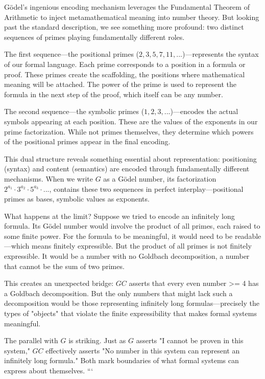 \documentclass[runningheads]{llncs}
\begin{document}
Gödel's ingenious encoding mechanism leverages the Fundamental Theorem of Arithmetic to inject metamathematical meaning into number theory. But looking past the standard description, we see something more profound: two distinct sequences of primes playing fundamentally different roles.

The first sequence—the positional primes ($2, 3, 5, 7, 11, ...$)—represents the syntax of our formal language. Each prime corresponds to a position in a formula or proof. These primes create the scaffolding, the positions where mathematical meaning will be attached. The power of the prime is used to represent the formula in the next step of the proof, which itself can be any number.

The second sequence—the symbolic primes ($1, 2, 3, ...$)—encodes the actual symbols appearing at each position. These are the values of the exponents in our prime factorization. While not primes themselves, they determine which powers of the positional primes appear in the final encoding.

This dual structure reveals something essential about representation: positioning (syntax) and content (semantics) are encoded through fundamentally different mechanisms. When we write $G$ as a Gödel number, its factorization $2^{a_1} \cdot 3^{a_2} \cdot 5^{a_3} \cdot ...$, contains these two sequences in perfect interplay—positional primes as bases, symbolic values as exponents.

What happens at the limit? Suppose we tried to encode an infinitely long formula. Its Gödel number would involve the product of all primes, each raised to some finite power. For the formula to be meaningful, it would need to be readable—which means finitely expressible. But the product of all primes is not finitely expressible. It would be a number with no Goldbach decomposition, a number that cannot be the sum of two primes.

This creates an unexpected bridge: $GC$ asserts that every even number >= 4 has a Goldbach decomposition. But the only numbers that might lack such a decomposition would be those representing infinitely long formulas—precisely the types of "objects" that violate the finite expressibility that makes formal systems meaningful.

The parallel with $G$ is striking. Just as $G$ asserts "I cannot be proven in this system," $GC$ effectively asserts "No number in this system can represent an infinitely long formula." Both mark boundaries of what formal systems can express about themselves.
```
\end{document}
